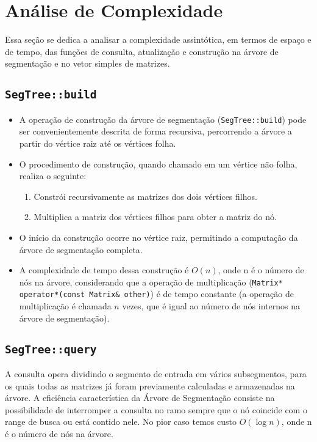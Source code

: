\documentclass{article}
\begin{document}
\section{Análise de Complexidade}
Essa seção se dedica a analisar a complexidade assintótica, em termos de espaço e de tempo, das funções de consulta, atualização e construção na árvore de segmentação e no vetor simples de matrizes.

\subsection{\texttt{SegTree::build}}
\begin{itemize}
    \item A operação de construção da árvore de segmentação (\texttt{SegTree::build}) pode ser convenientemente descrita de forma recursiva, percorrendo a árvore a partir do vértice raiz até os vértices folha.
    \item O procedimento de construção, quando chamado em um vértice não folha, realiza o seguinte:
        \begin{enumerate}
            \item Constrói recursivamente as matrizes dos dois vértices filhos.
            \item Multiplica a matriz dos vértices filhos para obter a matriz do nó.
        \end{enumerate}
    \item O início da construção ocorre no vértice raiz, permitindo a computação da árvore de segmentação completa.
    \item A complexidade de tempo dessa construção é \(O(n)\), onde n é o número de nós na árvore, considerando que a operação de multiplicação (\texttt{Matrix* operator*(const Matrix\& other)}) é de tempo constante (a operação de multiplicação é chamada \(n\) vezes, que é igual ao número de nós internos na árvore de segmentação).
\end{itemize}


\subsection{\texttt{SegTree::query}}
A consulta opera dividindo o segmento de entrada em vários subsegmentos, para os quais todas as matrizes já foram previamente calculadas e armazenadas na árvore. A eficiência característica da Árvore de Segmentação consiste na possibilidade de interromper a consulta no ramo sempre que o nó coincide com o range de busca ou está contido nele. No pior caso temos custo  \(O(\log n)\), onde n é o número de nós na árvore.
\end{document}
